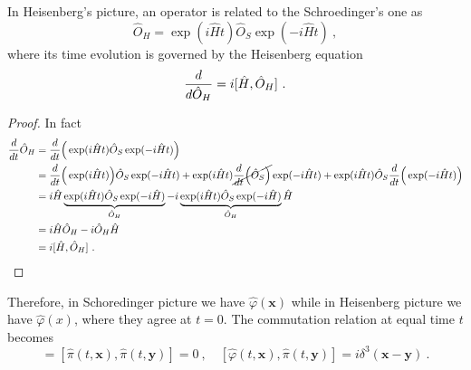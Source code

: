     In Heisenberg's picture, an operator is related to the Schroedinger's one as 
    \begin{equation*}
        \hat O_H = \exp(i \hat H t) \hat O_S \exp(- i \hat H t) ~,
    \end{equation*}
    where its time evolution is governed by the Heisenberg equation 
    \begin{equation*}
        \frac{d}{d\hat O_H} = i [\hat H, \hat O_H] ~.
    \end{equation*}
    \begin{proof}
        In fact 
        \begin{equation*}
        \begin{aligned}
            \frac{d}{dt} \hat O_H & = \frac{d}{dt} \Big ( \exp(i \hat H t) \hat O_S \exp(- i \hat H t) \Big) \\ & = \frac{d}{dt} \Big ( \exp(i \hat H t) \Big) \hat O_S \exp(- i \hat H t) + \exp(i \hat H t) \cancel{\frac{d}{dt} \Big (  \hat O_S  \Big)} \exp(- i \hat H t) + \exp(i \hat H t) \hat O_S \frac{d}{dt} \Big (  \exp(- i \hat H t) \Big ) \\ & = i \hat H \underbrace{\exp(i \hat H t) \hat O_S \exp(- i \hat H)}_{\hat O_H} - i \underbrace{\exp(i \hat H t) \hat O_S \exp(- i \hat H)}_{\hat O_H} \hat H \\ & = i \hat H \hat O_H - i \hat O_H \hat H \\ & = i [\hat H, \hat O_H] ~.
        \end{aligned}
        \end{equation*}
    \end{proof}

    Therefore, in Schoredinger picture we have $\hat \varphi(\mathbf x)$ while in Heisenberg picture we have $\hat \varphi(x)$, where they agree at $t=0$. The commutation relation at equal time $t$ becomes 
    \begin{equation*}
        [\hat \varphi(t, \mathbf x), \hat \varphi(t, \mathbf y)] = [\hat \pi(t, \mathbf x), \hat \pi(t, \mathbf y)] = 0 ~, \quad [\hat \varphi(t, \mathbf x), \hat \pi(t, \mathbf y)] = i \delta^3 (\mathbf x - \mathbf y) ~.
    \end{equation*}

